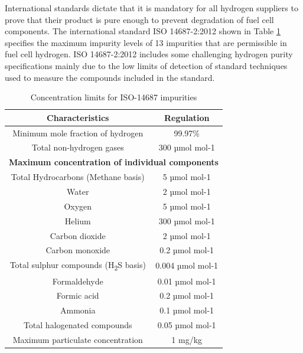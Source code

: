 International standards dictate that it is mandatory for all hydrogen suppliers to prove that their 
product is pure enough to prevent degradation of fuel cell components. The international standard ISO
14687-2:2012 \cite{InternationalStandardISO14687-2:20122012} shown in Table \ref{tab:1} specifies the 
maximum impurity levels of 13 impurities that are 
permissible in fuel cell hydrogen. ISO 14687-2:2012 includes some challenging hydrogen purity 
specifications mainly due to the low limits of detection of standard techniques used to measure the 
compounds included in the standard. 

\begin{table}[]
    \caption{Concentration limits for ISO-14687 impurities}
    \centering
    \begin{tabular}{@{}cc@{}}
    \toprule
    \textbf{Characteristics}                  & \textbf{Regulation}    \\ \midrule
    Minimum mole fraction of hydrogen         & 99.97\%                \\
    Total non-hydrogen gases                  & 300 µmol mol-1         \\ \midrule
    \multicolumn{2}{c}{\textbf{Maximum concentration of individual components}} \\ \midrule
    Total Hydrocarbons (Methane basis)        & 5 µmol mol-1           \\
    Water                                     & 2 µmol mol-1           \\
    Oxygen                                    & 5 µmol mol-1           \\
    Helium                                    & 300 µmol mol-1         \\
    Carbon dioxide                            & 2 µmol mol-1           \\
    Carbon monoxide                           & 0.2 µmol mol-1         \\
    Total sulphur compounds (H\textsubscript{2}S basis)       & 0.004 µmol mol-1       \\
    Formaldehyde                              & 0.01 µmol mol-1        \\
    Formic acid                               & 0.2 µmol mol-1         \\
    Ammonia                                   & 0.1 µmol mol-1         \\
    Total halogenated compounds               & 0.05 µmol mol-1        \\
    Maximum particulate concentration         & 1 mg/kg                \\ \bottomrule
    \end{tabular}
    \label{tab:1}
\end{table}

